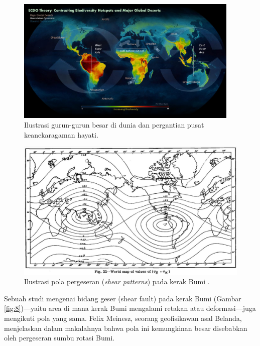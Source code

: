 \documentclass[10pt,twocolumn,letterpaper]{article}
\begin{document}
\begin{figure}[t]
\begin{center}
\includegraphics[width=0.95\textwidth]{biodiversity.jpg}
\end{center}
   \caption{Ilustrasi gurun-gurun besar di dunia dan pergantian pusat keanekaragaman hayati\cite{28}.}
\label{fig:9}
\end{figure}

\begin{figure}[t]
\begin{center}
   \includegraphics[width=1\linewidth]{meinesz3.jpg}
\end{center}
   \caption{Ilustrasi pola pergeseran (\textit{shear patterns}) pada kerak Bumi \cite{36}.}
\label{fig:8}
\label{fig:onecol}
\end{figure}

Sebuah studi mengenai bidang geser (shear fault) pada kerak Bumi (Gambar \ref{fig:8})—yaitu area di mana kerak Bumi mengalami retakan atau deformasi—juga mengikuti pola yang sama. Felix Meinesz, seorang geofisikawan asal Belanda, menjelaskan dalam makalahnya \cite{36} bahwa pola ini kemungkinan besar disebabkan oleh pergeseran sumbu rotasi Bumi.
\end{document}
